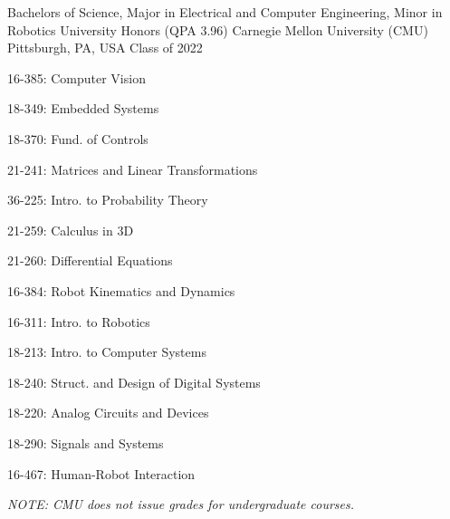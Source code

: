 \begin{cventries}
\cventry
{Bachelors of Science, Major in Electrical and Computer Engineering, Minor in Robotics  University Honors (QPA 3.96)} %
{Carnegie Mellon University (CMU)} %
{Pittsburgh, PA, USA} %
{Class of 2022} %
{ %
    \vspace{-0.5em}
	\begin{cvitems}
	\begin{multicols}{2}[]
        \item 16-385: Computer Vision 
        \item 18-349: Embedded Systems 
        \item 18-370: Fund. of Controls 
        \item 21-241: Matrices and Linear Transformations 
        \item 36-225: Intro. to Probability Theory 
		\item 21-259: Calculus in 3D 
        \item 21-260: Differential Equations 
        \item 16-384: Robot Kinematics and Dynamics 
        \item 16-311: Intro. to Robotics 
        \item 18-213: Intro. to Computer Systems 
        \item 18-240: Struct. and Design of Digital Systems 
        \item 18-220: Analog Circuits and Devices 
        \item 18-290: Signals and Systems 
        \item 16-467: Human-Robot Interaction 
	\end{multicols}
	\end{cvitems} 
    \smallskip   
    \textit{\scriptsize NOTE: CMU does not issue \grade{+/-} grades for undergraduate courses.}
}


\end{cventries}